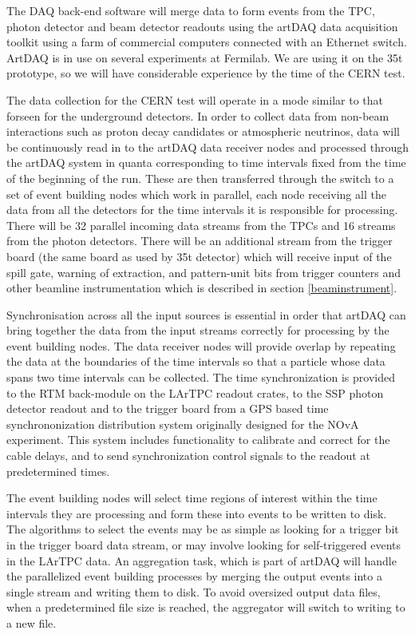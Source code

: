 The DAQ back-end software will merge data to form events from the TPC, 
photon detector and beam detector readouts using the 
artDAQ data acquisition toolkit using a farm of commercial 
computers connected with an Ethernet switch.  ArtDAQ is 
in use on several experiments at Fermilab.  We are using it
on the 35t prototype, so we will have considerable 
experience by the time of the CERN test.  

The data collection for the CERN test will operate in a mode 
similar to that forseen for the underground detectors. In order 
to collect data from non-beam interactions such as proton decay 
candidates or atmospheric neutrinos, data will be continuously
read in to the artDAQ data receiver nodes and processed through
the artDAQ system in quanta corresponding to time intervals fixed
from the time of the beginning of the run.  These are then 
transferred through the switch to a set of event building nodes 
which work in parallel, each node receiving all the data from all 
the detectors for the time intervals it is responsible for processing.
There will be 32 parallel incoming data streams from the TPCs
and 16 streams from the photon detectors.  There will be an additional
stream from the trigger board (the same board as used by 35t detector) 
which will receive input of the spill 
gate, warning of extraction, and pattern-unit bits from trigger counters
and other beamline instrumentation which is described in section \ref{beaminstrument}.

Synchronisation across all the input sources is essential in order 
that artDAQ can bring together the data from the input streams correctly for
processing by the event building nodes.  The data receiver nodes will provide
overlap by repeating the data at the boundaries of the time intervals so 
that a particle whose data spans two time intervals can be collected.  
The time synchronization is provided to the RTM back-module on the LArTPC 
readout crates, to the SSP photon detector readout and to the trigger board from
a GPS based time synchrononization distribution system originally designed 
for the NOvA experiment.  This system includes functionality to calibrate and 
correct for the cable delays, and to send synchronization control signals to
the readout at predetermined times.

The event building nodes will select time regions of interest within the time 
intervals they are processing and form these into events to be written to 
disk. The algorithms to select the events may be as simple as looking for 
a trigger bit in the trigger board data stream, or may involve looking 
for self-triggered events in the LArTPC data.  An aggregation task, which 
is part of artDAQ will handle the parallelized event building processes by 
merging the output events into a single stream and writing them to disk.
To avoid oversized output data files, when a predetermined file size is reached, 
the aggregator will switch to writing to a new file.  

